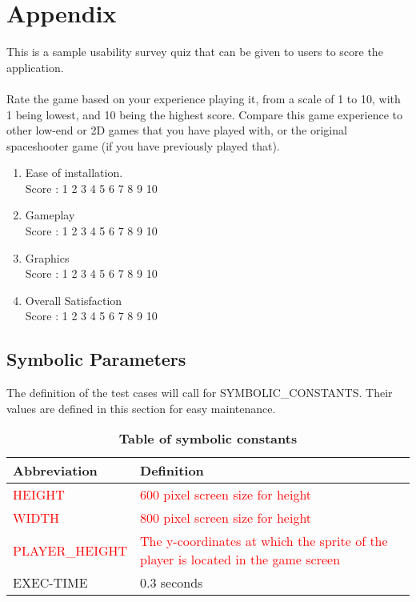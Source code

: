 \documentclass[12pt, titlepage]{article}
\begin{document}
\newpage

\section{Appendix}

This is a sample usability survey quiz that can be given to users to score the application. 
\\
\\Rate the game based on your experience playing it, from a scale of 1 to 10, with 1 being lowest, and 10 being the highest score. Compare this game experience to other low-end or 2D games that you have played with, or the original spaceshooter game (if you have previously played that).

\begin{enumerate}
\item{Ease of installation.}
\\Score :     1    2    3    4    5    6    7    8    9    10

\item{Gameplay}
\\Score :    1    2    3    4    5    6    7    8    9    10

\item{Graphics}
\\Score :      1    2    3    4    5    6    7    8    9    10

\item{Overall Satisfaction}
\\Score :     1    2    3    4    5    6    7    8    9    10

\end{enumerate}


\subsection{Symbolic Parameters}

The definition of the test cases will call for SYMBOLIC\_CONSTANTS.
Their values are defined in this section for easy maintenance.
    
\begin{table}[H]
\caption{\textbf{Table of symbolic constants}} \label{Table2}
\begin{tabularx}{\textwidth}{p{3.5cm}X}
\toprule
\textbf{Abbreviation} & \textbf{Definition} \\
\midrule
\textcolor{red}{HEIGHT} & \textcolor{red}{600 pixel screen size for height} \\ \hline
\textcolor{red}{WIDTH} & \textcolor{red}{800 pixel screen size for height} \\ \hline
\textcolor{red}{PLAYER\_HEIGHT} & \textcolor{red}{The y-coordinates at which the sprite of the player is located in the game screen} \\ \hline
EXEC-TIME & 0.3 seconds \\  
\bottomrule
\end{tabularx}

\end{table}
\end{document}
